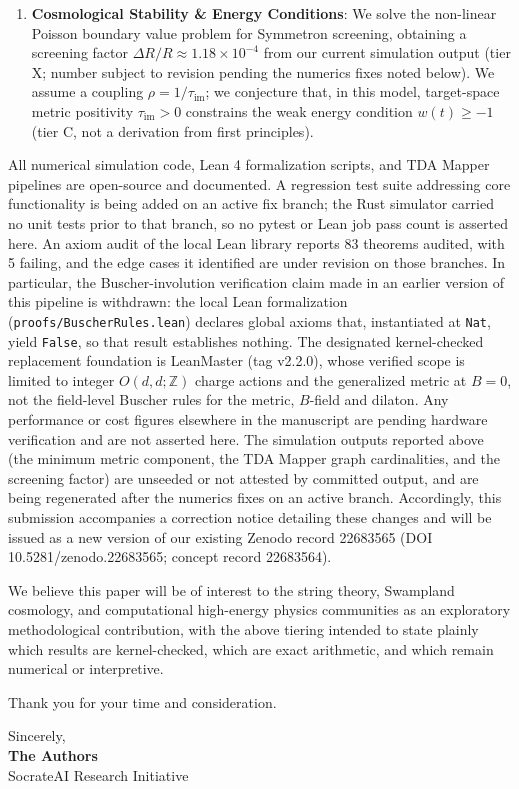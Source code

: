 \documentclass[11pt]{letter}
\providecommand{\numreconcile}[2]{#1}
\begin{document}
\begin{enumerate}
    \item \textbf{Cosmological Stability \& Energy Conditions}: We solve the non-linear Poisson boundary value problem for Symmetron screening, obtaining a screening factor $\Delta R/R \approx \numreconcile{1.18\times 10^{-4}}{\Delta R/R}$ from our current simulation output (tier X; number subject to revision pending the numerics fixes noted below). We assume a coupling $\rho = 1/\tau_{\text{im}}$; we conjecture that, in this model, target-space metric positivity $\tau_{\text{im}} > 0$ constrains the weak energy condition $w(t) \ge -1$ (tier C, not a derivation from first principles).
\end{enumerate}

All numerical simulation code, Lean 4 formalization scripts, and TDA Mapper pipelines are open-source and documented. A regression test suite addressing core functionality is being added on an active fix branch; the Rust simulator carried no unit tests prior to that branch, so no pytest or Lean job pass count is asserted here. An axiom audit of the local Lean library reports 83 theorems audited, with 5 failing, and the edge cases it identified are under revision on those branches. In particular, the Buscher-involution verification claim made in an earlier version of this pipeline is withdrawn: the local Lean formalization (\texttt{proofs/BuscherRules.lean}) declares global axioms that, instantiated at \texttt{Nat}, yield \texttt{False}, so that result establishes nothing. The designated kernel-checked replacement foundation is LeanMaster (tag v2.2.0), whose verified scope is limited to integer $O(d,d;\mathbb{Z})$ charge actions and the generalized metric at $B=0$, not the field-level Buscher rules for the metric, $B$-field and dilaton. Any performance or cost figures elsewhere in the manuscript are pending hardware verification and are not asserted here. The simulation outputs reported above (the minimum metric component, the TDA Mapper graph cardinalities, and the screening factor) are unseeded or not attested by committed output, and are being regenerated after the numerics fixes on an active branch. Accordingly, this submission accompanies a correction notice detailing these changes and will be issued as a new version of our existing Zenodo record 22683565 (DOI 10.5281/zenodo.22683565; concept record 22683564).

We believe this paper will be of interest to the string theory, Swampland cosmology, and computational high-energy physics communities as an exploratory methodological contribution, with the above tiering intended to state plainly which results are kernel-checked, which are exact arithmetic, and which remain numerical or interpretive.

Thank you for your time and consideration.

\vspace{1.5em}

\noindent Sincerely, \\
\textbf{The Authors} \\
SocrateAI Research Initiative
\end{document}
